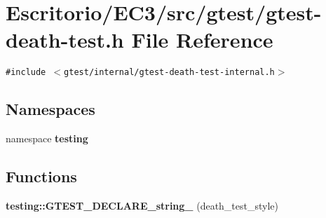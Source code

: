 \section{Escritorio/EC3/src/gtest/gtest-death-test.h File Reference}
\label{gtest-death-test_8h}
{\tt \#include $<$gtest/internal/gtest-death-test-internal.h$>$}\par
\subsection*{Namespaces}
\begin{CompactItemize}
\item 
namespace {\bf testing}
\end{CompactItemize}
\subsection*{Functions}
\begin{CompactItemize}
\item 
{\bf testing::GTEST\_\-DECLARE\_\-string\_\-} (death\_\-test\_\-style)
\end{CompactItemize}
